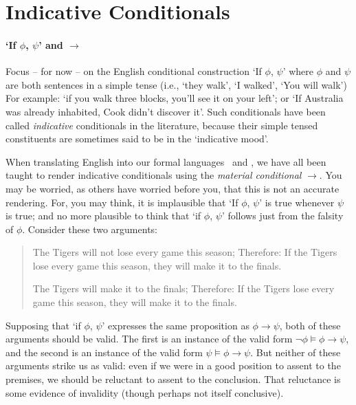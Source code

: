 
\section{Indicative Conditionals}


\paragraph{`If $\phi$, $\psi$' and $\to$}

Focus – for now – on the English conditional construction `If $\phi$, $\psi$' where $\phi$ and $\psi$ are both sentences in a simple tense (i.e., `they walk', `I walked', `You will walk') For example: `if you walk three blocks, you'll see it on your left'; or `If Australia was already inhabited, Cook didn't discover it'. Such conditionals have been called \emph{indicative} conditionals in the literature, because their simple tensed constituents are sometimes said to be in the `indicative mood'. 


When translating English into our formal languages \lone\ and \ltwo, we have all been taught to render indicative conditionals using the \emph{material conditional} $\to$. You may be worried, as others have worried before you, that this is not an accurate rendering. For, you may think, it is implausible that `If $\phi$, $\psi$' is true whenever $\psi$ is true; and no more plausible to think that `if $\phi$, $\psi$' follows just from the falsity of $\phi$. Consider these two arguments: 
\begin{quote}
	\begin{exe}
	\ex \begin{xlist}
	\ex The Tigers  will not lose every game this season;
	\ex Therefore: If the Tigers lose every game this season, they will make it to the finals.\end{xlist}
	\ex \begin{xlist}
		\ex The Tigers will make it to the finals;
	\ex Therefore: If the Tigers lose every game this season, they will make it to the finals.\end{xlist}
 \end{exe}
\end{quote}
Supposing that `if $\phi$, $\psi$' expresses the same proposition as $\phi \to \psi$, both of these arguments should be valid. The first  is an instance of the valid form $¬\phi \vDash \phi \to \psi$, and the second is an instance of the valid form $\psi \vDash \phi \to \psi$. But neither of these arguments strike us as valid: even if we were in a good position to assent to the premises, we should be reluctant to assent to the conclusion. That reluctance is some evidence of invalidity (though perhaps not itself conclusive). 

